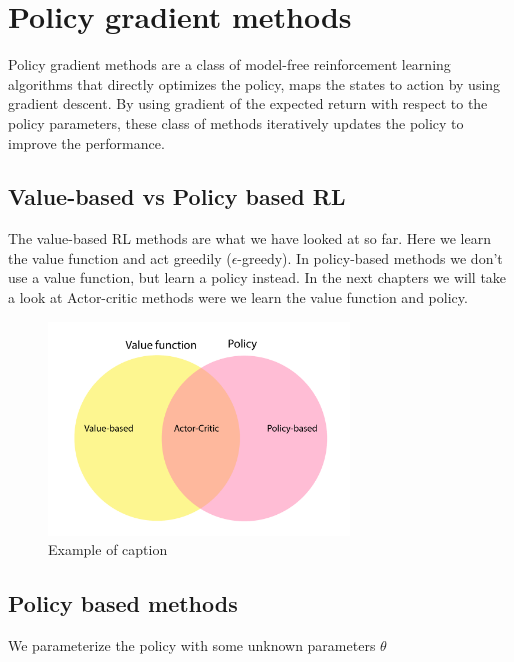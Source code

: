 
\section{Policy gradient methods}
Policy gradient methods are a class of model-free reinforcement learning algorithms that directly optimizes the policy, maps the states to action by using gradient descent. By using gradient of the expected return with respect to the policy parameters, these class of methods iteratively updates the policy to improve the performance. 

\subsection*{Value-based vs Policy based RL}
The value-based RL methods are what we have looked at so far. Here we learn the value function and act greedily ($\epsilon$-greedy). In policy-based methods we don't use a value function, but learn a policy instead. In the next chapters we will take a look at Actor-critic methods were we learn the value function and policy.

\begin{figure}[ht!]
\centering
\includegraphics[width=80mm]{figures/valuepolicy.pdf}
\caption{Example of caption}
\label{fig:example}
\end{figure}


\subsection*{Policy based methods}
We parameterize the policy with some unknown parameters $\theta$ 


